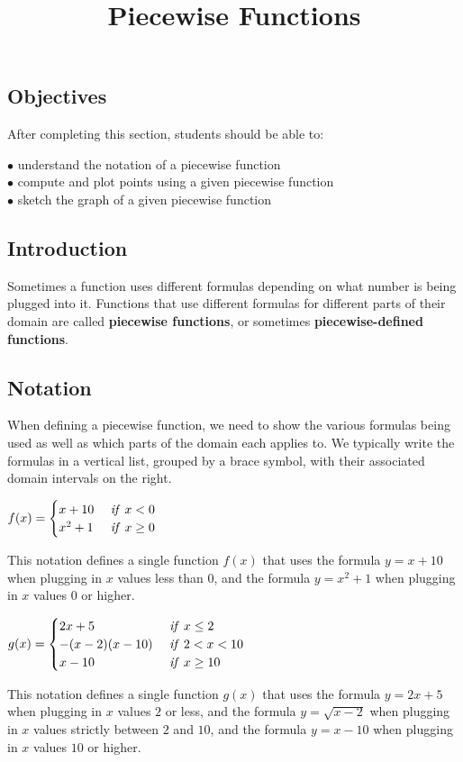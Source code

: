 \documentclass{ximera}
\title{Piecewise Functions}
\begin{document}
\begin{abstract} \end{abstract}
\maketitle

\subsection{Objectives}
After completing this section, students should be able to:
\vspace{.05in}

\noindent$\bullet$ understand the notation of a piecewise function
\\$\bullet$ compute and plot points using a given piecewise function
\\$\bullet$ sketch the graph of a given piecewise function

\subsection{Introduction}
Sometimes a function uses different formulas depending on what number is being plugged into it. Functions that use different formulas for different parts of their domain are called \textbf{piecewise functions}, or sometimes \textbf{piecewise-defined functions}.

\subsection{Notation}
When defining a piecewise function, we need to show the various formulas being used as well as which parts of the domain each applies to. We typically write the formulas in a vertical list, grouped by a brace symbol, with their associated domain intervals on the right.

\begin{example}
$f(x)=\begin{cases} x+10 & \mbox{ \emph{if} }x<0\\x^2+1 & \mbox{ \emph{if} } x\geq 0\end{cases}$

This notation defines a single function $f(x)$ that uses the formula $y=x+10$ when plugging in $x$ values less than $0$, and the formula $y=x^2+1$ when plugging in $x$ values $0$ or higher.
\end{example}

\begin{example}
$g(x)=\begin{cases} 2x+5 & \mbox{ \emph{if} }x\leq 2\\ -(x-2)(x-10) & \mbox{ \emph{if} } 2<x<10\\ x-10 & \mbox{ \emph{if} } x\geq 10\end{cases}$

This notation defines a single function $g(x)$ that uses the formula $y=2x+5$ when plugging in $x$ values $2$ or less, and the formula $y=\sqrt{x-2}$ when plugging in $x$ values strictly between $2$ and $10$, and the formula $y=x-10$ when plugging in $x$ values $10$ or higher.
\end{example}
\end{document}
